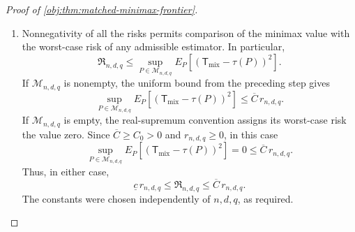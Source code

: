 \documentclass[11pt]{article}
\begin{document}
\begin{proof}[Proof of \cref{obj:thm:matched-minimax-frontier}]
\begin{enumerate}
\item Nonnegativity of all the risks permits comparison of the minimax value with the worst-case risk of any admissible estimator. In particular,
\[
\mathfrak R_{n,d,q}
\le
\sup_{P\in\mathcal M_{n,d,q}}
E_P\!\left[(\mathsf T_{\mathrm{mix}}-\tau(P))^2\right].
\]
If \(\mathcal M_{n,d,q}\) is nonempty, the uniform bound from the preceding step gives
\[
\sup_{P\in\mathcal M_{n,d,q}}
E_P\!\left[(\mathsf T_{\mathrm{mix}}-\tau(P))^2\right]
\le\overline C\,r_{n,d,q}.
\]
If \(\mathcal M_{n,d,q}\) is empty, the real-supremum convention assigns its worst-case risk the value zero. Since \(\overline C\ge C_0>0\) and \(r_{n,d,q}\ge0\), in this case
\[
\sup_{P\in\mathcal M_{n,d,q}}
E_P\!\left[(\mathsf T_{\mathrm{mix}}-\tau(P))^2\right]
=0\le\overline C\,r_{n,d,q}.
\]
Thus, in either case,
\[
\underline c\,r_{n,d,q}
\le\mathfrak R_{n,d,q}
\le\overline C\,r_{n,d,q}.
\]
The constants were chosen independently of \(n,d,q\), as required.
\end{enumerate}
\end{proof}
\end{document}
